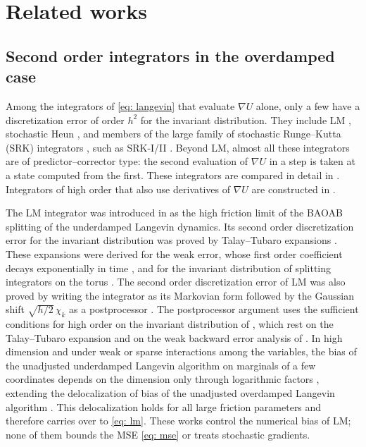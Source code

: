 \documentclass{article}
\numberwithin{equation}{section}
\begin{document}
\section{Related works}
\label{sec: related}

\subsection{Second order integrators in the overdamped case}
\label{subsec: related lm}

Among the integrators of \eqref{eq: langevin} that evaluate $\nabla U$ alone, only a few have a discretization error of order $h^2$ for the invariant distribution. They include LM \citep{leimkuhler2013rational, vilmart2015postprocessed}, stochastic Heun \citep{milstein2004stochastic, debrabant2010runge, mannella2025numerical}, and members of the large family of stochastic Runge--Kutta (SRK) integrators \citep{rossler2010runge, debrabant2010runge, li2019stochastic, yang2026accelerating}, such as SRK-I/II \citep{yang2026accelerating, ye2026mse}. Beyond LM, almost all these integrators are of predictor--corrector type: the second evaluation of $\nabla U$ in a step is taken at a state computed from the first. These integrators are compared in detail in \citep{ye2026mse}. Integrators of high order that also use derivatives of $\nabla U$ are constructed in \citep{talay1990second, abdulle2014high}.

The LM integrator was introduced in \citep{leimkuhler2013rational} as the high friction limit of the BAOAB splitting of the underdamped Langevin dynamics. Its second order discretization error for the invariant distribution was proved by Talay--Tubaro expansions \citep{talay1990expansion}. These expansions were derived for the weak error, whose first order coefficient decays exponentially in time \citep{leimkuhler2014long}, and for the invariant distribution of splitting integrators on the torus \citep{leimkuhler2015computation}. The second order discretization error of LM was also proved by writing the integrator as its Markovian form followed by the Gaussian shift $\sqrt{h/2}\,\chi_k$ as a postprocessor \citep{vilmart2015postprocessed}. The postprocessor argument uses the sufficient conditions for high order on the invariant distribution of \citep{abdulle2014high}, which rest on the Talay--Tubaro expansion \citep{talay1990expansion} and on the weak backward error analysis of \citep{debussche2012weak, kopec2013weak}. In high dimension and under weak or sparse interactions among the variables, the bias of the unadjusted underdamped Langevin algorithm on marginals of a few coordinates depends on the dimension only through logarithmic factors \citep{chen2026delocalization}, extending the delocalization of bias of the unadjusted overdamped Langevin algorithm \citep{chen2026convergence}. This delocalization holds for all large friction parameters and therefore carries over to \eqref{eq: lm}.
These works control the numerical bias of LM; none of them bounds the MSE \eqref{eq: mse} or treats stochastic gradients.
\end{document}
